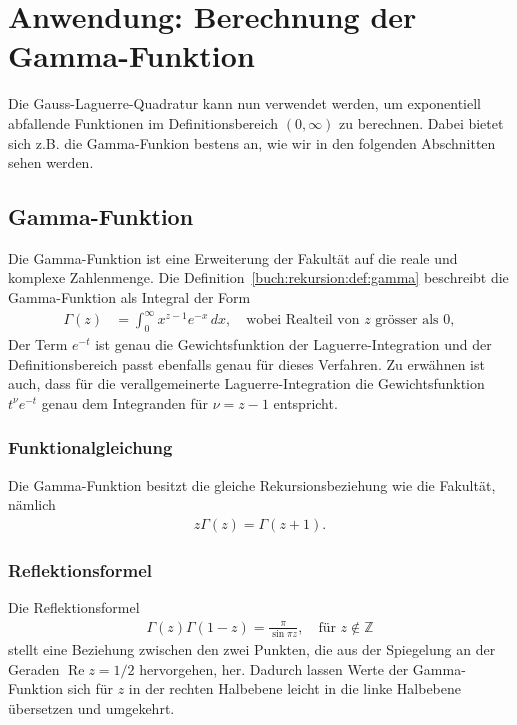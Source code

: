%
%
%
\section{Anwendung: Berechnung der Gamma-Funktion
  \label{laguerre:section:quad-gamma}}
Die Gauss-Laguerre-Quadratur kann nun verwendet werden,
um exponentiell abfallende Funktionen im Definitionsbereich $(0, \infty)$ zu
berechnen.
Dabei bietet sich z.B. die Gamma-Funkion bestens an, wie wir in den folgenden
Abschnitten sehen werden.

\subsection{Gamma-Funktion}
Die Gamma-Funktion ist eine Erweiterung der Fakultät auf die reale und komplexe
Zahlenmenge.
Die Definition~\ref{buch:rekursion:def:gamma} beschreibt die Gamma-Funktion als
Integral der Form
\begin{align}
\Gamma(z)
 & =
\int_0^\infty x^{z-1} e^{-x} \, dx
,
\quad
\text{wobei Realteil von $z$ grösser als $0$}
,
\label{laguerre:gamma}
\end{align}
Der Term $e^{-t}$ ist genau die Gewichtsfunktion der Laguerre-Integration und
der Definitionsbereich passt ebenfalls genau für dieses Verfahren.
Zu erwähnen ist auch, dass für die verallgemeinerte Laguerre-Integration die
Gewichtsfunktion $t^\nu e^{-t}$ genau dem Integranden für $\nu=z-1$ entspricht.

\subsubsection{Funktionalgleichung}
Die Gamma-Funktion besitzt die gleiche Rekursionsbeziehung wie die Fakultät,
nämlich
\begin{align}
z \Gamma(z)
=
\Gamma(z+1)
.
\label{laguerre:gamma_funktional}
\end{align}

\subsubsection{Reflektionsformel}
Die Reflektionsformel
\begin{align}
\Gamma(z) \Gamma(1 - z)
=
\frac{\pi}{\sin \pi z}
,\quad
\text{für }
z \notin \mathbb{Z}
\label{laguerre:gamma_refform}
\end{align}
stellt eine Beziehung zwischen den zwei Punkten,
die aus der Spiegelung an der Geraden $\operatorname{Re} z = 1/2$ hervorgehen,
her.
Dadurch lassen Werte der Gamma-Funktion sich für $z$ in der rechten Halbebene
leicht in die linke Halbebene übersetzen und umgekehrt.

